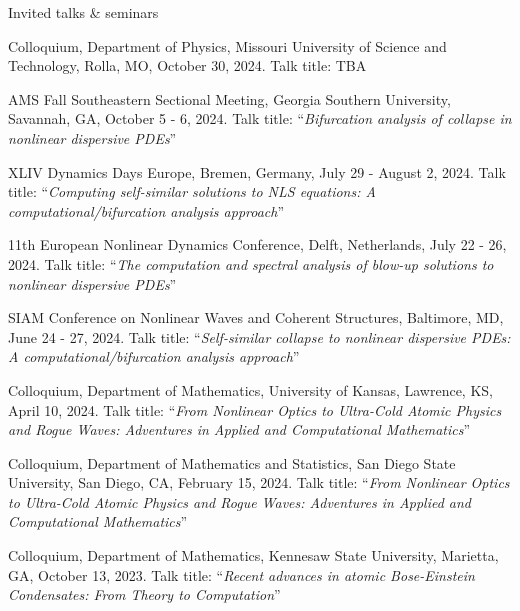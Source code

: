 \documentclass[10pt]{article} %
\begin{document}
\begin{section}{Invited talks \& seminars}
\begin{etaremune}
\setlength\itemsep{1em}

\item
\vskip  -6.5mm
Colloquium, Department of Physics, Missouri University of Science and Technology, Rolla, MO, October 30, 2024.
Talk title: TBA

\item AMS Fall Southeastern Sectional Meeting, Georgia Southern University, Savannah, GA, October 5 - 6, 2024.
Talk title: ``\textit{Bifurcation analysis of collapse in nonlinear dispersive PDEs}''

\item XLIV Dynamics Days Europe, Bremen, Germany, July 29 - August 2, 2024.
Talk title: ``\textit{Computing self-similar solutions to NLS equations: A computational/bifurcation analysis approach}''

\item 11th European Nonlinear Dynamics Conference, Delft, Netherlands, July 22 - 26, 2024.
Talk title: ``\textit{The computation and spectral analysis of blow-up solutions to nonlinear dispersive PDEs}''

\item SIAM Conference on Nonlinear Waves and Coherent Structures, Baltimore, MD, June 24 - 27, 2024.
Talk title: ``\textit{Self-similar collapse to nonlinear dispersive PDEs: A computational/bifurcation analysis approach}''

\item Colloquium, Department of Mathematics, University of Kansas, Lawrence, KS, April 10, 2024.
Talk title: ``\textit{From Nonlinear Optics to Ultra-Cold Atomic Physics and Rogue Waves:
Adventures in Applied and Computational Mathematics}''

\item Colloquium, Department of Mathematics and Statistics, San Diego State University, San Diego, CA, February 15, 2024.
Talk title: ``\textit{From Nonlinear Optics to Ultra-Cold Atomic Physics and Rogue Waves:
Adventures in Applied and Computational Mathematics}''

\item  Colloquium, Department of Mathematics, Kennesaw State University, Marietta, GA, October 13, 2023.
Talk title: ``\textit{Recent advances in atomic Bose-Einstein Condensates: From Theory to Computation}''


\end{etaremune}
\end{section}
\end{document}
